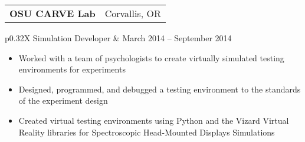 \documentclass[letterpaper,10pt,titlepage]{article}
\newcommand{\leftW}{0.32\textwidth}
\begin{document}
\begin{tabularx}{\linewidth}{Xr}
	\textbf{OSU CARVE Lab} & Corvallis, OR\\
\end{tabularx}
\begin{tabularx}{\linewidth}{p{\leftW}X}
	Simulation Developer   & March 2014 -- September 2014\\
\end{tabularx}
\begin{itemize} \itemsep1pt \parskip0pt 
\item Worked with a team of psychologists to create virtually simulated testing environments for experiments
\item Designed, programmed, and debugged a testing environment to the standards of the experiment design
\item Created virtual testing environments using Python and the Vizard Virtual Reality libraries for Spectroscopic Head-Mounted Displays Simulations
\end{itemize}

\begin{comment} %
\begin{tabularx}{\linewidth}{Xr}
\textbf{\textit{Crossroads Carnegie Art Center}} & \textbf{Volunteer}\\
\textbf{Technical Support, Web Master}           & June 2013 -- August 2013\\
Baker City, Oregon & \\
\end{tabularx}

\begin{itemize} \itemsep1pt \parskip0pt \parsep0pt
\item Created digital backups of previous years tax information
\item Transferred customer data to a new cloud database for the Center
\item Maintained custom PHP/XHTML website to specifications
\item Provided consultation on creation of requirements for a new website
\end{itemize}
\end{comment}
\end{document}

